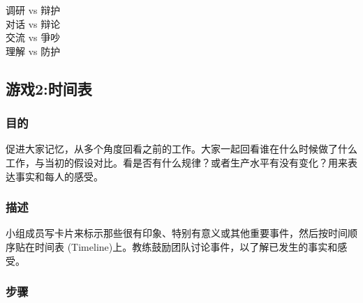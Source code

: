 调研 vs 辩护\\
对话 vs 辩论\\
交流 vs 爭吵\\
理解 vs 防护\\

\hypertarget{ux6e38ux620f2ux65f6ux95f4ux8868}{%
\subsection{游戏2:时间表}\label{ux6e38ux620f2ux65f6ux95f4ux8868}}

\hypertarget{ux76eeux7684-1}{%
\subsubsection{目的}\label{ux76eeux7684-1}}

促进大家记忆，从多个角度回看之前的工作。大家一起回看谁在什么时候做了什么工作，与当初的假设对比。看是否有什么规律？或者生产水平有没有变化？用来表达事实和每人的感受。

\hypertarget{ux63cfux8ff0-1}{%
\subsubsection{描述}\label{ux63cfux8ff0-1}}

小组成员写卡片来标示那些很有印象、特别有意义或其他重要事件，然后按时间顺序贴在时间表
(Timeline)上。教练鼓励团队讨论事件，以了解已发生的事实和感受。

\hypertarget{ux6b65ux9aa4-1}{%
\subsubsection{步骤}\label{ux6b65ux9aa4-1}}

